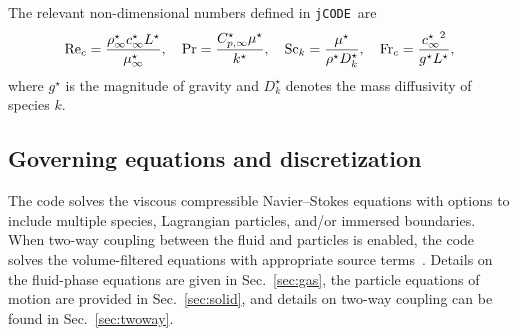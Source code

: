\documentclass[12pt]{article}
\newcommand{\code}[1]{\texttt{#1}}
\newcommand{\Frc}{\mbox{\rm Fr}_c} %
\newcommand{\Rec}{\mbox{\rm Re}_c} %
\newcommand{\Sc}{\mbox{\rm Sc}} %
\newcommand{\jcode}{\code{jCODE}~}
\begin{document}
The relevant non-dimensional numbers defined in \jcode are
\begin{align}\label{No_ndj}
\Rec = \frac{\rho_{\infty}^{\star} c_{\infty}^{\star} L^{\star} }{\mu_{\infty}^{\star}},  \quad \Pr = \frac{C_{p,\infty}^{\star} \mu^{\star}}{k^{\star}}, \quad \Sc_k = \frac{\mu^{\star}}{\rho^{\star}D_k^{\star}}, \quad \Frc = \frac{{c_{\infty}^{\star}}^2}{g^{\star} L^{\star}},
\end{align}
where $g^\star$ is the magnitude of gravity and $D_k^{\star}$ denotes the mass diffusivity of species $k$. %

\subsection{Governing equations and discretization\label{sec:Equations}}
The code solves the viscous compressible Navier--Stokes equations with options to include multiple species, Lagrangian particles, and/or immersed boundaries. When two-way coupling between the fluid and particles is enabled, the code solves the volume-filtered equations with appropriate source terms~\cite{shallcross2020volume}. Details on the fluid-phase equations are given in Sec.~\ref{sec:gas}, the particle equations of motion are provided in Sec.~\ref{sec:solid}, and details on two-way coupling can be found in Sec.~\ref{sec:twoway}.
\end{document}
